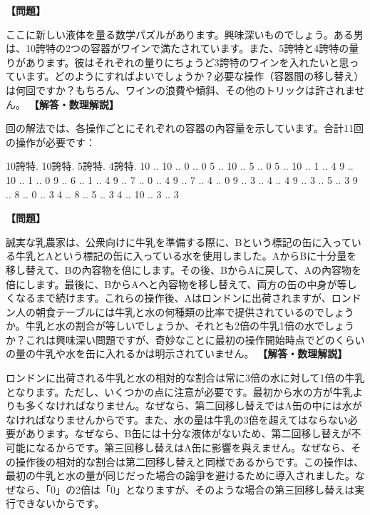 \documentclass[10pt,a4paper,oneside,openany]{ltjsbook}
\begin{document}
\begin{tcolorbox}[colback=softblue,colframe=primaryblue,title=\textbf{第 365 問：新しい量り組問題 （原題: NEW MEASURING PUZZLE.）},arc=2mm,boxrule=1pt,breakable]
\textbf{【問題】}\par\vspace{0.3em}
ここに新しい液体を量る数学パズルがあります。興味深いものでしょう。ある男は、10誇特の2つの容器がワインで満たされています。また、5誇特と4誇特の量りがあります。彼はそれぞれの量りにちょうど3誇特のワインを入れたいと思っています。どのようにすればよいでしょうか？必要な操作（容器間の移し替え）は何回ですか？もちろん、ワインの浪費や傾斜、その他のトリックは許されません。
\tcblower
\textbf{【解答・数理解説】}\par\vspace{0.3em}
回の解法では、各操作ごとにそれぞれの容器の內容量を示しています。合計11回の操作が必要です：

    10誇特. 10誇特. 5誇特. 4誇特.
       10   ..   10   ..   0   ..   0
        5   ..   10   ..   5   ..   0
        5   ..   10   ..   1   ..   4
        9   ..   10   ..   1   ..   0
        9   ..    6   ..   1   ..   4
        9   ..    7   ..   0   ..   4
        9   ..    7   ..   4   ..   0
        9   ..    3   ..   4   ..   4
        9   ..    3   ..   5   ..   3
        9   ..    8   ..   0   ..   3
        4   ..    8   ..   5   ..   3
        4   ..   10   ..   3   ..   3
\end{tcolorbox}

\begin{tcolorbox}[colback=softblue,colframe=primaryblue,title=\textbf{第 366 問：正直な乳農家 （原題: THE HONEST DAIRYMAN.）},arc=2mm,boxrule=1pt,breakable]
\textbf{【問題】}\par\vspace{0.3em}
誠実な乳農家は、公衆向けに牛乳を準備する際に、Bという標記の缶に入っている牛乳とAという標記の缶に入っている水を使用しました。AからBに十分量を移し替えて、Bの內容物を倍にします。その後、BからAに戻して、Aの內容物を倍にします。最後に、BからAへと內容物を移し替えて、両方の缶の中身が等しくなるまで続けます。これらの操作後、Aはロンドンに出荷されますが、ロンドン人の朝食テーブルには牛乳と水の何種類の比率で提供されているのでしょうか。牛乳と水の割合が等しいでしょうか、それとも2倍の牛乳1倍の水でしょうか？これは興味深い問題ですが、奇妙なことに最初の操作開始時点でどのくらいの量の牛乳や水を缶に入れるかは明示されていません。
\tcblower
\textbf{【解答・数理解説】}\par\vspace{0.3em}
ロンドンに出荷される牛乳と水の相対的な割合は常に3倍の水に対して1倍の牛乳となります。ただし、いくつかの点に注意が必要です。最初から水の方が牛乳よりも多くなければなりません。なぜなら、第二回移し替えではA缶の中には水がなければなりませんからです。また、水の量は牛乳の3倍を超えてはならない必要があります。なぜなら、B缶には十分な液体がないため、第二回移し替えが不可能になるからです。第三回移し替えはA缶に影響を與えません。なぜなら、その操作後の相対的な割合は第二回移し替えと同様であるからです。この操作は、最初の牛乳と水の量が同じだった場合の論爭を避けるために導入されました。なぜなら、「0」の2倍は「0」となりますが、そのような場合の第三回移し替えは実行できないからです。
\end{tcolorbox}
\end{document}
